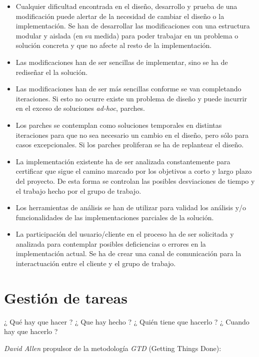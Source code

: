 \begin{itemize}
	\item Cualquier dificultad encontrada en el diseño, desarrollo y prueba de una modificación puede alertar de la necesidad de cambiar el diseño o la implementación. Se han de desarrollar las modificaciones con una estructura modular y aislada (en su medida) para poder trabajar en un problema o solución concreta y que no afecte al resto de la implementación.
	\item Las modificaciones han de ser sencillas de implementar, sino se ha de rediseñar el la solución.
	\item Las modificaciones han de ser más sencillas conforme se van completando iteraciones. Si esto no ocurre existe un problema de diseño y puede incurrir en el exceso de soluciones \emph{ad-hoc}, parches.
	\item Los parches se contemplan como soluciones temporales en distintas iteraciones para que no sea necesario un cambio en el diseño, pero sólo para casos excepcionales. Si los parches proliferan se ha de replantear el diseño.
	\item La implementación existente ha de ser analizada constantemente para certificar que sigue el camino marcado por los objetivos a corto y largo plazo del proyecto. De esta forma se controlan las posibles desviaciones de tiempo y el trabajo hecho por el grupo de trabajo.
	\item Los herramientas de análisis se han de utilizar para validad los análisis y/o funcionalidades de las implementaciones parciales de la solución.
	\item La participación del usuario/cliente en el proceso ha de ser solicitada y analizada para contemplar posibles deficiencias o errores en la implementación actual. Se ha de crear una canal de comunicación para la interactuación entre el cliente y el grupo de trabajo.
\end{itemize}



\section{Gestión de tareas}
\label{sec:gestion-tareas}

\par¿ Qué hay que hacer ? ¿ Que hay hecho ? ¿ Quién tiene que hacerlo ? ¿ Cuando hay que hacerlo ?

\par \emph{David Allen} propulsor de la metodología \emph{GTD} (Getting Things Done):


